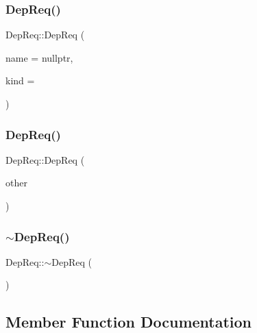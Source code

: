 \subsubsection{\texorpdfstring{Dep\+Req()}{DepReq()}\hspace{0.1cm}{\footnotesize\ttfamily [1/2]}}
{\footnotesize\ttfamily Dep\+Req\+::\+Dep\+Req (\begin{DoxyParamCaption}\item[{const char $\ast$}]{name = {\ttfamily nullptr},  }\item[{short}]{kind = {} }\end{DoxyParamCaption})}

\mbox{\label{classDepReq_adf6800c87693c1de5b88d89c577186b8}} 
\subsubsection{\texorpdfstring{Dep\+Req()}{DepReq()}\hspace{0.1cm}{\footnotesize\ttfamily [2/2]}}
{\footnotesize\ttfamily Dep\+Req\+::\+Dep\+Req (\begin{DoxyParamCaption}\item[{const \hyperlink{classDepReq}{Dep\+Req} \&}]{other }\end{DoxyParamCaption})}

\mbox{\label{classDepReq_a6f770d0327bf43dcef5f6a58f5a32183}} 
\subsubsection{\texorpdfstring{$\sim$\+Dep\+Req()}{~DepReq()}}
{\footnotesize\ttfamily Dep\+Req\+::$\sim$\+Dep\+Req (\begin{DoxyParamCaption}{ }\end{DoxyParamCaption})\hspace{0.3cm}{\ttfamily [virtual]}}



\subsection{Member Function Documentation}
\mbox{\label{classDepReq_a3ec88f2216d73f6b499ae6653a60437b}} 
